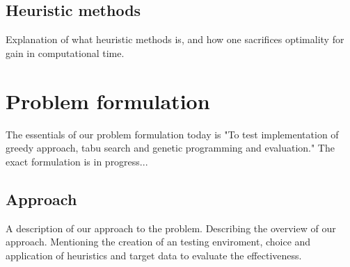\subsection{Heuristic methods}
Explanation of what heuristic methods is, and how one sacrifices
optimality for gain in computational time.\\

\section{Problem formulation}
The essentials of our problem formulation today is "To test
implementation of greedy approach, tabu search and genetic programming
and evaluation." The exact formulation is in progress...


\subsection{Approach}
A description of our approach to the problem. Describing the overview
of our approach. Mentioning the creation of an testing enviroment,
choice and application of heuristics and target data to evaluate the effectiveness.

